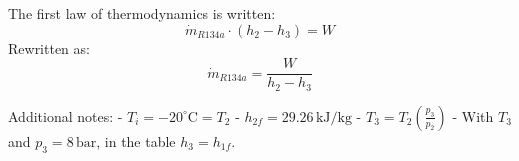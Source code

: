 The first law of thermodynamics is written:  
\[
\dot{m}_{R134a} \cdot (h_2 - h_3) = W
\]  
Rewritten as:  
\[
\dot{m}_{R134a} = \frac{W}{h_2 - h_3}
\]  

Additional notes:  
- \( T_i = -20^\circ \text{C} = T_2 \)  
- \( h_{2f} = 29.26 \, \text{kJ/kg} \)  
- \( T_3 = T_2 \left( \frac{p_3}{p_2} \right) \)  
- With \( T_3 \) and \( p_3 = 8 \, \text{bar} \), in the table \( h_3 = h_{1f} \).